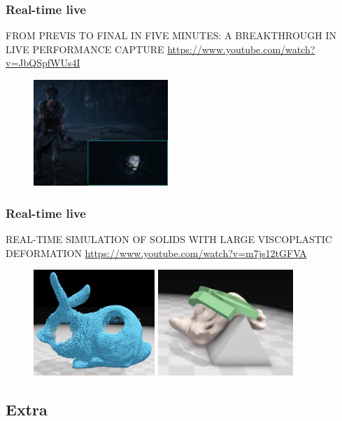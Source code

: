 \frame
{
  \frametitle{Real-time live}
FROM PREVIS TO FINAL IN FIVE MINUTES: A BREAKTHROUGH IN LIVE PERFORMANCE CAPTURE
  \url{https://www.youtube.com/watch?v=JbQSpfWUs4I }
  
  \begin{figure}
  	\centering
  	\includegraphics[height=4cm]{img/rtl.png}
  \end{figure}
  

}
\frame
{
	\frametitle{Real-time live}
		
REAL-TIME SIMULATION OF SOLIDS WITH LARGE VISCOPLASTIC DEFORMATION
		\url{https://www.youtube.com/watch?v=m7js12tGFVA}
		  \begin{figure}
		  	\centering
		  	\includegraphics[height=4cm]{img/visco1.png}
		  	\includegraphics[height=4cm]{img/visco2.png}
		  \end{figure}
		  
}
\subsection{Extra}
